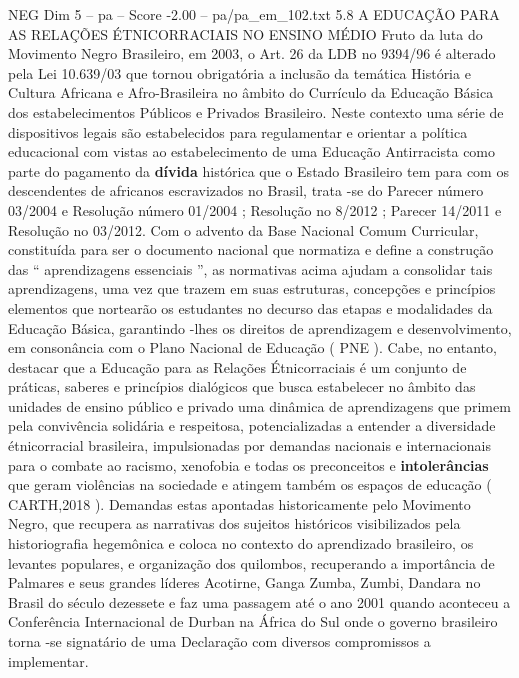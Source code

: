 \begin{textsample}{NEG Dim 5 – pa – Score -2.00 – pa/pa\_em\_102.txt}  \label{ex:f5_neg_043}
5.8 A EDUCAÇÃO PARA AS RELAÇÕES ÉTNICORRACIAIS NO ENSINO MÉDIO Fruto da luta do Movimento Negro Brasileiro, em 2003, o Art. 26 da LDB no 9394/96 é alterado pela Lei 10.639/03 que tornou obrigatória a inclusão da temática História e Cultura Africana e Afro-Brasileira no âmbito do Currículo da Educação Básica dos estabelecimentos Públicos e Privados Brasileiro.
Neste contexto uma série de dispositivos legais são estabelecidos para regulamentar e orientar a política educacional com vistas ao estabelecimento de uma Educação Antirracista como parte do pagamento da \textbf{dívida} histórica que o Estado Brasileiro tem para com os descendentes de africanos escravizados no Brasil, trata -se do Parecer número 03/2004 e Resolução número 01/2004 ; Resolução no 8/2012 ; Parecer 14/2011 e Resolução no 03/2012.
Com o advento da Base Nacional Comum Curricular, constituída para ser o documento nacional que normatiza e define a construção das “ aprendizagens essenciais ”, as normativas acima ajudam a consolidar tais aprendizagens, uma vez que trazem em suas estruturas, concepções e princípios elementos que nortearão os estudantes no decurso das etapas e modalidades da Educação Básica, garantindo -lhes os direitos de aprendizagem e desenvolvimento, em consonância com o Plano Nacional de Educação ( PNE ).
Cabe, no entanto, destacar que a Educação para as Relações Étnicorraciais é um conjunto de práticas, saberes e princípios dialógicos que busca estabelecer no âmbito das unidades de ensino público e privado uma dinâmica de aprendizagens que primem pela convivência solidária e respeitosa, potencializadas a entender a diversidade étnicorracial brasileira, impulsionadas por demandas nacionais e internacionais para o combate ao racismo, xenofobia e todas os preconceitos e \textbf{intolerâncias} que geram violências na sociedade e atingem também os espaços de educação ( CARTH,2018 ).
Demandas estas apontadas historicamente pelo Movimento Negro, que recupera as narrativas dos sujeitos históricos visibilizados pela historiografia hegemônica e coloca no contexto do aprendizado brasileiro, os levantes populares, e organização dos quilombos, recuperando a importância de Palmares e seus grandes líderes Acotirne, Ganga Zumba, Zumbi, Dandara no Brasil do século dezessete e faz uma passagem até o ano 2001 quando aconteceu a Conferência Internacional de Durban na África do Sul onde o governo brasileiro torna -se signatário de uma Declaração com diversos compromissos a implementar.

\end{textsample}
